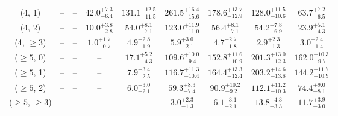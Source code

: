 \begin{table}[h!]
{\begin{tabular}{ccccccccc}
	(4, 1) & -- & -- & $42.0^{+ 7.3 }_{- 6.4 }$ & $131.1^{+ 12.5 }_{- 11.5 }$ & $261.5^{+ 16.4 }_{- 15.6 }$ & $178.6^{+ 13.7 }_{- 12.9 }$ & $128.0^{+ 11.5 }_{- 10.6 }$ & $63.7^{+ 7.2 }_{- 6.5 }$ \\[0.5ex] 
	(4, 2) & -- & -- & $10.0^{+ 3.8 }_{- 2.8 }$ & $54.0^{+ 8.1 }_{- 7.1 }$ & $123.0^{+ 11.9 }_{- 11.0 }$ & $56.4^{+ 8.1 }_{- 7.1 }$ & $54.2^{+ 7.8 }_{- 6.9 }$ & $23.9^{+ 5.1 }_{- 4.3 }$ \\[0.5ex] 
	(4, $\ge3$) & -- & -- & $1.0^{+ 1.7 }_{- 0.7 }$ & $4.9^{+ 2.8 }_{- 1.9 }$ & $5.9^{+ 3.0 }_{- 2.1 }$ & $4.7^{+ 2.7 }_{- 1.8 }$ & $2.9^{+ 2.3 }_{- 1.3 }$ & $3.0^{+ 2.4 }_{- 1.4 }$ \\[0.5ex] 
	($\ge5$, 0) & -- & -- & -- & $17.1^{+ 5.2 }_{- 4.3 }$ & $109.6^{+ 10.0 }_{- 9.4 }$ & $152.8^{+ 11.6 }_{- 10.9 }$ & $201.3^{+ 13.0 }_{- 12.3 }$ & $162.0^{+ 10.3 }_{- 9.7 }$ \\[0.5ex] 
	($\ge5$, 1) & -- & -- & -- & $7.9^{+ 3.4 }_{- 2.5 }$ & $116.7^{+ 11.3 }_{- 10.4 }$ & $164.4^{+ 13.3 }_{- 12.4 }$ & $203.2^{+ 14.6 }_{- 13.8 }$ & $144.2^{+ 11.7 }_{- 10.9 }$ \\[0.5ex] 
	($\ge5$, 2) & -- & -- & -- & $6.0^{+ 3.0 }_{- 2.1 }$ & $59.3^{+ 8.3 }_{- 7.4 }$ & $90.9^{+ 10.2 }_{- 9.2 }$ & $112.1^{+ 11.2 }_{- 10.3 }$ & $74.4^{+ 9.0 }_{- 8.1 }$ \\[0.5ex] 
	($\ge5$, $\ge3$) & -- & -- & -- & -- & $3.0^{+ 2.3 }_{- 1.3 }$ & $6.1^{+ 3.1 }_{- 2.1 }$ & $13.8^{+ 4.3 }_{- 3.3 }$ & $11.7^{+ 3.9 }_{- 3.0 }$ \\[0.5ex] 
	\hline
	\hline
\end{tabular}}
\end{table}
